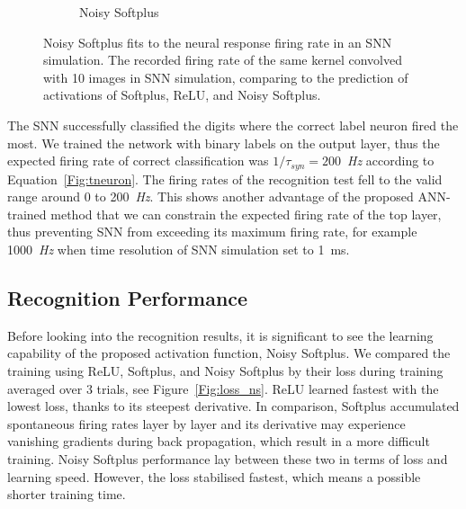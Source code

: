 \documentclass{article}
\begin{document}
\begin{figure}[hb!]
\begin{subfigure}[hb]{0.32\textwidth}
		\caption{Noisy Softplus}
	\end{subfigure}
		\caption{Noisy Softplus fits to the neural response firing rate in an SNN simulation.
			The recorded firing rate of the same kernel convolved with 10 images in SNN simulation, comparing to the prediction of activations of Softplus, ReLU, and Noisy Softplus.}
		\label{fig:af_compare}
\end{figure}		

The SNN successfully classified the digits where the correct label neuron fired the most.
We trained the network with binary labels on the output layer, thus the expected firing rate of correct classification was $1/\tau_{syn}=200$~\textit{Hz} according to Equation~\ref{Fig:tneuron}.
The firing rates of the recognition test fell to the valid range around 0 to 200~\textit{Hz}.
This shows another advantage of the proposed ANN-trained method that we can constrain the expected firing rate of the top layer, thus preventing SNN from exceeding its maximum firing rate, for example 1000~\textit{Hz} when time resolution of SNN simulation set to 1~ms.


\subsection{Recognition Performance}
\label{subsec:result_compare}
Before looking into the recognition results, it is significant to see the learning capability of the proposed activation function, Noisy Softplus.
We compared the training using ReLU, Softplus, and Noisy Softplus by their loss during training averaged over 3 trials, see Figure~\ref{Fig:loss_ns}.
ReLU learned fastest with the lowest loss, thanks to its steepest derivative.
In comparison, Softplus accumulated spontaneous firing rates layer by layer and its derivative may experience vanishing gradients during back propagation, which result in a more difficult training.
Noisy Softplus performance lay between these two in terms of loss and learning speed.
However, the loss stabilised fastest, which means a possible shorter training time.
\end{document}
